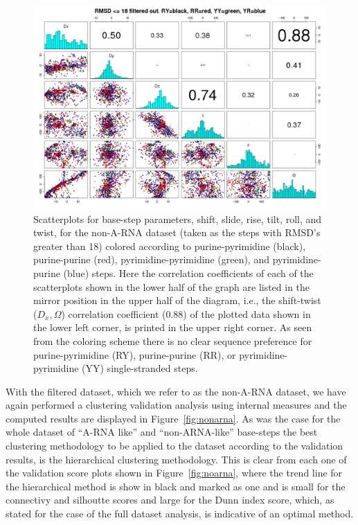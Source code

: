 \begin{figure}
 \centering
\includegraphics[angle=90, scale=0.48]{Chapter2/noarna_step.png}
\caption{Scatterplots  for base-step  parameters, shift,  slide, rise,
  tilt, roll, and twist, for the non-A-RNA dataset (taken as the steps
  with RMSD's greater than 18) colored according
  to      purine-pyrimidine     (black),      purine-purine     (red),
  pyrimidine-pyrimidine   (green),    and   pyrimidine-purine   (blue)
  steps. Here the correlation coefficients of each of the scatterplots
  shown  in the  lower half  of  the graph  are listed  in the  mirror
  position in  the upper  half of the  diagram, i.e.,  the shift-twist
  ($D_{x}, \Omega$) correlation coefficient (0.88) of the plotted data
  shown  in the  lower  left corner,  is  printed in  the upper  right
  corner.  As  seen  from the  coloring  scheme there  is no  clear
  sequence preference for  purine-pyrimidine (RY), purine-purine (RR),
  or pyrimidine-pyrimidine (YY) single-stranded steps.}
 \label{fig:pairsnoarna}
\end{figure}

With the filtered dataset, which we refer to as the non-A-RNA dataset,
we  have  again  performed  a  clustering  validation  analysis  using
internal  measures   and  the   computed  results  are   displayed  in
Figure~\ref{fig:nonarna}.  As was the  case for  the whole  dataset of
``A-RNA  like'' and ``non-ARNA-like''  base-steps the  best clustering
methodology to be  applied to the dataset according  to the validation
results, is  the hierarchical  clustering methodology. This  is clear
from   each   one   of   the   validation   score   plots   shown   in
Figure~\ref{fig:noarna},  where the  trend line  for  the hierarchical
method  is show in  black and  marked as  one and  is small  for the
connectivy and  silhoutte scores and  large for the Dunn  index score,
which,  as  stated for  the  case of  the  full  dataset analysis,  is
indicative of an optimal method.

